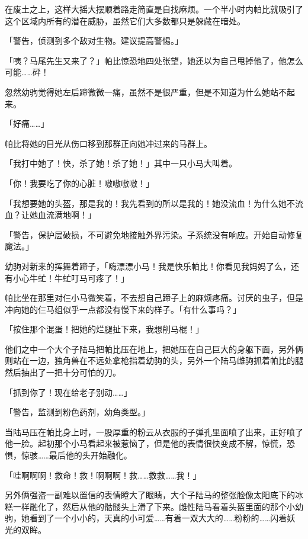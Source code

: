 
\horizonline

在废土之上，这样大摇大摆顺着路走简直是自找麻烦。一个半小时内帕比就吸引了这个区域内所有的潜在威胁，虽然它们大多数都只是躲藏在暗处。

「{\mt 警告，侦测到多个敌对生物。建议提高警惕。}」

「咦？马尾先生又来了？」帕比惊恐地四处张望，她还以为自己甩掉他了，他怎么可能……砰！


忽然幼驹觉得她左后蹄微微一痛，虽然不是很严重，但是不知道为什么她站不起来。

「好痛……」

帕比将她的目光从伤口移到那群正向她冲过来的马群上。

「我打中她了！快，杀了她！杀了她！」其中一只小马大叫着。

「你！我要吃了你的心脏！嗷嗷嗷嗷！」

「我想要她的头盔，那是我的！我先看到的所以是我的！她没流血！为什么她不流血？让她血流满地啊！」

「{\mt 警告，保护层破损，不可避免地接触外界污染。子系统没有响应。开始自动修复魔法。}」

幼驹对新来的挥舞着蹄子，「嗨漂漂小马！我是快乐帕比！你看见我妈妈了么，还有小心牛虻！牛虻叮马可疼了！」

帕比坐在那里对仨小马微笑着，不去想自己蹄子上的麻烦疼痛。讨厌的虫子，但是冲向她的仨马组似乎一点都没有慢下来的样子。「有什么事吗？」

「按住那个混蛋！把她的烂腿扯下来，我想削马棍！」

他们之中一个大个子陆马把帕比压在地上，把她压在自己巨大的身躯下面，另外俩则站在一边，独角兽在不远处拿枪指着幼驹的头，另外一个陆马雌驹抓着帕比的腿然后抽出了一把十分可怕的刀。

「抓到你了！现在给老子别动……」

「{\mt 警告，监测到粉色药剂，幼角类型。}」

当陆马压在帕比身上时，一股厚重的粉云从衣服的子弹孔里面喷了出来，正好喷了他一脸。起初那个小马看起来被惹恼了，但是他的表情很快变成不解，惊慌，恐惧，惊骇……最后他的头开始融化。

「哇啊啊啊！救命！救！啊啊啊！救……救救……我！」

另外俩强盗一副难以置信的表情瞪大了眼睛，大个子陆马的整张脸像太阳底下的冰糕一样融化了，然后从他的骷髅头上滑了下来。雌性陆马看着头盔里面的那个小幼驹，她看到了一个小小的，天真的小可爱……有着一双大大的……粉粉的……闪着妖光的双眸。

